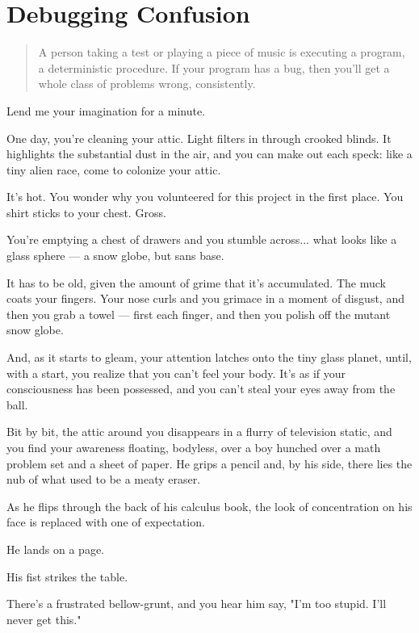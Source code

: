 \section{Debugging Confusion}
\begin{quote}
A person taking a test or playing a piece of music is executing a program, a
deterministic procedure.  If your program has a bug, then you'll get a whole
class of problems wrong, consistently.
\end{quote}

Lend me your imagination for a minute.

One day, you're cleaning your attic. Light filters in through crooked blinds. It
highlights the substantial dust in the air, and you can make out
each speck: like a tiny alien race, come to colonize your attic. 

It's hot. You wonder why you volunteered for this project in the first
place. You shirt sticks to your chest. Gross.

You're emptying a chest of drawers and you stumble across...  what
looks like a glass sphere --- a snow globe, but sans base.

It has to be old, given the amount of grime that it's accumulated. The muck
coats your fingers. Your nose curls and you grimace in a moment of disgust, and then you grab a
towel --- first each finger, and then you polish off the mutant snow
globe.

And, as it starts to gleam, your attention latches onto the tiny glass planet,
until, with a start, you realize that you can't feel your body. It's as if your
consciousness has been possessed, and you can't steal your eyes away from the
ball.

Bit by bit, the attic around you disappears in a flurry of television static, and you find your awareness floating,
bodyless, over a boy hunched over a math problem set and a sheet of paper. He
grips a pencil and, by his side, there lies the nub of what used to be a meaty
eraser.

As he flips through the back of his calculus book, the look of concentration on
his face is replaced with one of expectation.

He lands on a page. 

His fist strikes the table.

There's a frustrated bellow-grunt, and you hear him say, "I'm too stupid. I'll
never get this."

